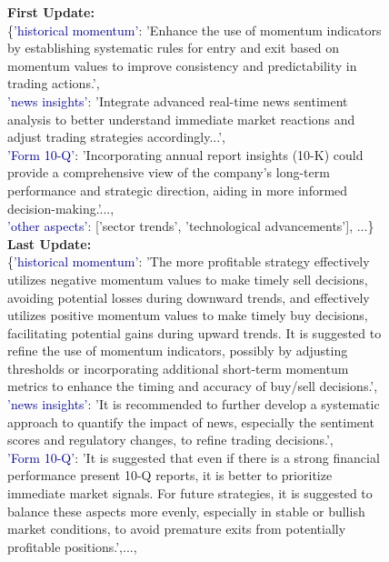 \begin{figure}[ht]
\centering
\begin{tcbraster}[raster columns=1]

    \begin{tcolorbox}[
        colback=white,
        colframe=black,
        title=Updated Investment Belief Contents,
        boxsep=2pt,
        top=2pt,
        bottom=2pt,
        sharp corners,
        arc=0pt
    ]
    \small
    \raggedright
    \textbf{First Update:} \\
    \{\textcolor{darkblue}{'historical momentum'}: 'Enhance the use of momentum indicators by establishing systematic rules for entry and exit based on momentum values to improve consistency and predictability in trading actions.',\\
    \textcolor{darkblue}{'news insights'}: 'Integrate advanced real-time news sentiment analysis to better understand immediate market reactions and adjust trading strategies accordingly...',\\
    \textcolor{darkblue}{'Form 10-Q'}: 'Incorporating annual report insights (10-K) could provide a comprehensive view of the company's long-term performance and strategic direction, aiding in more informed decision-making.'..., \\
    \textcolor{darkblue}{'other aspects'}: ['sector trends', 'technological advancements'], ...\}\\
    \textbf{Last Update:}\\
    \{\textcolor{darkblue}{'historical momentum'}: 'The more profitable strategy effectively utilizes negative momentum values to make timely sell decisions, avoiding potential losses during downward trends, and effectively utilizes positive momentum values to make timely buy decisions, facilitating potential gains during upward trends.  It is suggested to refine the use of momentum indicators, possibly by adjusting thresholds or incorporating additional short-term momentum metrics to enhance the timing and accuracy of buy/sell decisions.',\\
    \textcolor{darkblue}{'news insights'}: 'It is recommended to further develop a systematic approach to quantify the impact of news, especially the sentiment scores and regulatory changes, to refine trading decisions.', \\
    \textcolor{darkblue}{'Form 10-Q'}: 'It is suggested that even if there is a strong financial performance present 10-Q reports, it is better to prioritize immediate market signals. For future strategies, it is suggested to balance these aspects more evenly, especially in stable or bullish market conditions, to avoid premature exits from potentially profitable positions.',...,\\

\end{tcolorbox}
\end{tcbraster}
\end{figure}
